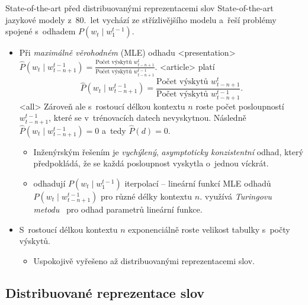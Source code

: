 \begin{frame}{State-of-the-art před distribuovanými reprezentacemi slov}
State-of-the-art jazykové modely z~80.\ let vychází ze střízlivějšího
modelu a~řeší problémy spojené s~odhadem $P(w_t\mid w_1^{t-1})$.

\pause

\begin{itemize}[<+->]
\item Při \emph{maximálně věrohodném} (MLE)
  odhadu
\mode
<presentation>
  $\hat P(w_t\mid w_{t-n+1}^{t-1}) = \frac{\text{Počet
  výskytů }w_{t-n+1}^{t}}{\text{Počet výskytů }w_{t-n+1}^{t-1}}$.
\mode
<article>
  platí
  $$\hat P(w_t\mid w_{t-n+1}^{t-1}) = \frac{\text{Počet
  výskytů }w_{t-n+1}^{t}}{\text{Počet výskytů }w_{t-n+1}^{t-1}}.$$
\mode
<all>
  Zároveň ale
  s~rostoucí délkou kontextu $n$ roste počet posloupností $w_{t-n+1}^{t-1}$,
  které se v~trénovacích datech nevyskytnou. Následně $\hat P(w_t\mid
  w_{t-n+1}^{t-1}) = 0$ a~tedy $\hat P(d) = 0$.
\begin{itemize}[<+->]
\item Inženýrským řešením je \emph{vychýlený}, \emph{asymptoticky
  konzistentní} odhad, který předpokládá, že se každá posloupnost vyskytla
o~jednou víckrát.~\autocites{lidstone20}
\item \textcite{jelinek80} odhadují $P(w_t\mid w_1^{t-1})$ iterpolací --
  lineární funkcí MLE odhadů $P(w_t\mid w_{t-n+1}^{t-1})$ pro různé délky
  kontextu $n$. \textcite{katz87} využívá \emph{Turingovu
  metodu}~\autocites{good53, nadas85} pro odhad
  parametrů lineární funkce.
\end{itemize}
\item S~rostoucí délkou kontextu $n$ exponenciálně roste velikost tabulky
  s~počty výskytů.
\begin{itemize}[<+->]
\item Uspokojivě vyřešeno až distribuovanými reprezentacemi slov.
\end{itemize}
\end{itemize}
\end{frame}

\subsection{Distribuované reprezentace slov}

